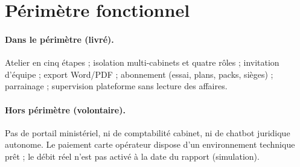 \section{Périmètre fonctionnel}
\label{sec:perimetre}

\paragraph{Dans le périmètre (livré).}
Atelier en cinq étapes ; isolation multi-cabinets et quatre rôles ; invitation d'équipe ; export Word/PDF ; abonnement (essai, plans, packs, sièges) ; parrainage ; supervision plateforme sans lecture des affaires.

\paragraph{Hors périmètre (volontaire).}
Pas de portail ministériel, ni de comptabilité cabinet, ni de chatbot juridique autonome. Le paiement carte opérateur dispose d'un environnement technique prêt ; le débit réel n'est pas activé à la date du rapport (simulation).
